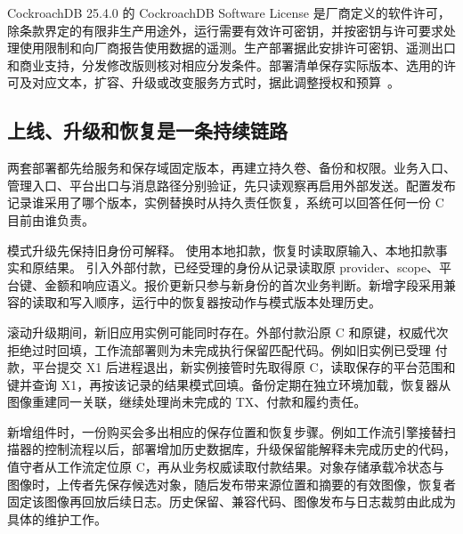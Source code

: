 CockroachDB 25.4.0 的 CockroachDB Software License 是厂商定义的软件许可，除条款界定的有限非生产用途外，运行需要有效许可密钥，并按密钥与许可要求处理使用限制和向厂商报告使用数据的遥测。生产部署据此安排许可密钥、遥测出口和商业支持，分发修改版则核对相应分发条件。部署清单保存实际版本、选用的许可及对应文本，扩容、升级或改变服务方式时，据此调整授权和预算~\cite{ch21-licenses}。

\subsection{上线、升级和恢复是一条持续链路}

两套部署都先给服务和保存域固定版本，再建立持久卷、备份和权限。业务入口、管理入口、平台出口与消息路径分别验证，先只读观察再启用外部发送。配置发布记录谁采用了哪个版本，实例替换时从持久责任恢复，系统可以回答任何一份 C 目前由谁负责。

模式升级先保持旧身份可解释。 使用本地扣款，恢复时读取原输入、本地扣款事实和原结果。 引入外部付款，已经受理的身份从记录读取原 provider、scope、平台键、金额和响应语义。报价更新只参与新身份的首次业务判断。新增字段采用兼容的读取和写入顺序，运行中的恢复器按动作与模式版本处理历史。

滚动升级期间，新旧应用实例可能同时存在。外部付款沿原 C 和原键，权威代次拒绝过时回填，工作流部署则为未完成执行保留匹配代码。例如旧实例已受理  付款，平台提交 X1 后进程退出，新实例接管时先取得原 C，读取保存的平台范围和键并查询 X1，再按该记录的结果模式回填。备份定期在独立环境加载，恢复器从图像重建同一关联，继续处理尚未完成的 TX、付款和履约责任。

新增组件时，一份购买会多出相应的保存位置和恢复步骤。例如工作流引擎接替扫描器的控制流程以后，部署增加历史数据库，升级保留能解释未完成历史的代码，值守者从工作流定位原 C，再从业务权威读取付款结果。对象存储承载冷状态与图像时，上传者先保存候选对象，随后发布带来源位置和摘要的有效图像，恢复者固定该图像再回放后续日志。历史保留、兼容代码、图像发布与日志裁剪由此成为具体的维护工作。
